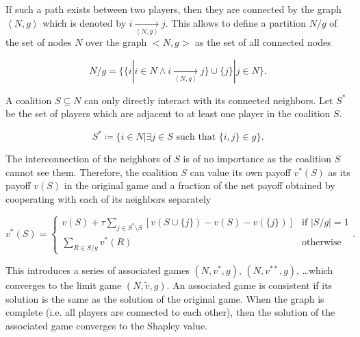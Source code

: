 If such a path exists between two players, then they are connected by the graph $\left<N, g\right>$
which is denoted by $i \underset{\left< N, g \right>}{\rightarrow} j$. This allows to
define a partition $N/g$ of the set of nodes $N$ over the graph $<N, g>$ as the set of all
connected nodes

\begin{equation}
	N/g = \{\{ i | i \in N \land i \underset{\left<N, g \right>}{\rightarrow} j\} \cup \{j\} | j \in N \}.
\end{equation}


A coalition $S \subseteq N$ can only directly interact with its connected neighbors. Let
$S^*$ be the set of players which are adjacent to at least one player in the coalition $S$.


\begin{equation}
	S^* \coloneqq \{ i \in N | \exists j \in S \text{ such that } \{i, j\} \in g \}.
\end{equation}

The interconnection of the neighbors of $S$ is of no importance as the coalition
$S$ cannot see them. Therefore, the coalition $S$ can value its own payoff $v^*(S)$ as its
payoff $v(S)$ in the original game and a fraction of the net payoff obtained by cooperating with
each of its neighbors separately\cite{hamiache2001associated}


\begin{equation}
	\label{eq:associated_game}
	v^*(S) =
	\begin{cases}
		\displaystyle
		v(S) + \tau \sum_{j \in S^* \setminus S} \left[ v(S \cup \{j\}) - v(S) - v(\{j\}) \right] & \text{if } |S/g| = 1 \\
		\displaystyle
		\sum_{R \in S/g} v^*(R)                                                                   & \text{otherwise}
	\end{cases}
	.
\end{equation}

This introduces a series of associated games $(N, v^*, g)$, $(N, v^{**}, g)$, \dots which converges
to the limit game $(N, \tilde{v}, g)$. An associated game is consistent if its solution is the same
as the solution of the original game. When the graph is complete (i.e. all players are connected to
each other), then the solution of the associated game converges to the Shapley value.\cite{hamiache2001associated}


